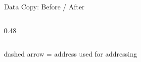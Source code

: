 \documentclass{beamer}
\begin{document}
\begin{frame}{Data Copy: Before / After}
\begin{columns}[T]
\begin{column}{0.48\textwidth}
{\begin{tikzpicture}[x=10mm, y=8mm]
\end{tikzpicture}%
}
\end{column}

\end{columns}

\vspace{2mm}
{\scriptsize\color{black!55} dashed arrow = address used for addressing\par}

\end{frame}
\end{document}
